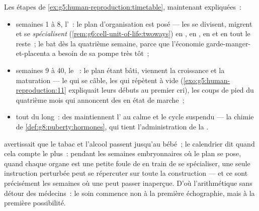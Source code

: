 \begin{proposition}\label{prop:g8:from-egg-to-birth:timetable}
Les étapes de \cref{ex:g5:human-reproduction:timetable}, maintenant
expliquées~:
\begin{itemize}
  \item semaines 1 à 8, l'\emph{}~: le plan d'organisation
        est posé --- les  se divisent, migrent et se
        \emph{spécialisent}
        (\cref{rem:g6:cell-unit-of-life:twoways}) en , en ,
        en  et en tout le reste~; le  bat dès la quatrième
        semaine, parce que l'économie garde-manger-et-placenta a
        besoin de sa pompe très tôt~;
  \item semaines 9 à 40, le \emph{}~: le plan étant bâti,
        viennent la croissance et la maturation --- le  qui
        se câble, les  qui répètent à vide
        (\cref{exo:g5:human-reproduction:11} expliquait leurs
        débuts au premier cri), les coups de pied du quatrième mois
        qui annoncent des  en état de marche~;
  \item tout du long~: des  maintiennent l' au calme
        et le cycle suspendu --- la chimie de
        \cref{def:g8:puberty:hormones}, qui tient
        l'administration de la .
\end{itemize}
\end{proposition}
\admitted

\begin{example}\label{ex:g8:from-egg-to-birth:earlycare}
 avertissait que le tabac et
l'alcool passent jusqu'au bébé~; le calendrier dit quand cela compte
le plus~: pendant les semaines embryonnaires où le plan se pose,
quand chaque organe est une petite foule de  en train de se
spécialiser, une seule instruction perturbée peut se répercuter sur
toute la construction --- et ce sont précisément les semaines où une
 peut passer inaperçue. D'où l'arithmétique sans détour des
médecins~: le soin commence non à la première échographie, mais à la
première possibilité.
\end{example}

